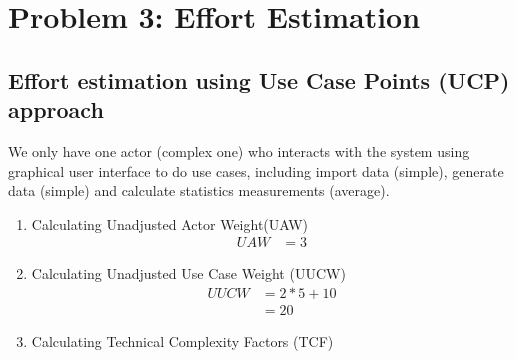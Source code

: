 \section{Problem 3: Effort Estimation}

\subsection{Effort estimation using Use Case Points (UCP) approach}
We only have one actor (complex one) who interacts with the system using graphical user interface to do use cases, including import data (simple), generate data (simple) and calculate statistics measurements (average).

\begin{enumerate}
\item {Calculating Unadjusted Actor Weight(UAW)}
\begin{align}
    UAW     &= 3
\end{align}

\item {Calculating Unadjusted Use Case Weight (UUCW)}
\vspace{8pt}
\begin{align}
    UUCW     &= 2 * 5 + 10\\
            &= 20
\end{align}

\item {Calculating Technical Complexity Factors (TCF)}


\end{enumerate}
